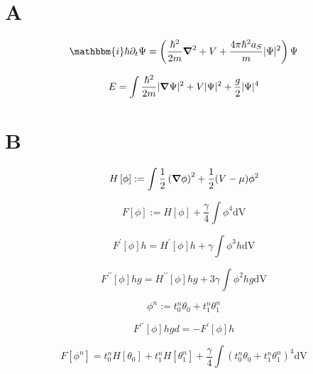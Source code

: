 \documentclass[12pt,a4paper]{article}
\author{Želimir Marojević}
\newcommand{\iu}{\ensuremath{\mathbbm{i}}}
\newcommand{\dV}{\ensuremath{\mathrm{dV}}}
\begin{document}
\section{A}

\begin{equation}
\iu \hbar \partial_t \Psi = \left( \frac{\hbar^2}{2m} \grad^2 + V + \frac{4\pi\hbar^2a_S}{m} \vert \Psi \vert^2 \right) \Psi
\end{equation}

\begin{equation}
E = \int \frac{\hbar^2}{2m} \vert \grad \Psi \vert^2 + V \vert \Psi \vert^2 + \frac{g}{2} \vert \Psi \vert^4
\end{equation}

\section{B}
\begin{equation}
H\left[\phi\right] := \int \frac{1}{2} \left( \grad \phi \right)^2 + \frac{1}{2} (V-\mu)\phi^2
\end{equation}

\begin{equation}
F\left[\phi\right] := H\left[\phi\right] + \frac{\gamma}{4}\int\phi^4 \dV
\end{equation}

\begin{equation}
F^\prime\left[\phi\right] h = H^\prime\left[\phi\right] h + \gamma \int \phi^3 h \dV
\end{equation}

\begin{equation}
F^{\prime\prime}\left[\phi\right] h g = H^{\prime\prime}\left[\phi\right] h g + 3 \gamma \int \phi^2 h g \dV
\end{equation}

\begin{equation}
\phi^n := t^n_0 \theta_0 + t^n_1 \theta^n_1
\end{equation}

\begin{equation}
F^{\prime\prime}\left[\phi\right] h g d = -F^\prime\left[\phi\right] h
\end{equation}


\begin{equation}
F\left[\phi^n\right] = t^n_0 H\left[\theta_0\right] + t^n_1 H\left[\theta^n_1\right] + \frac{\gamma}{4} \int \left(t^n_0 \theta_0 + t^n_1 \theta^n_1\right)^4 \dV
\end{equation}
\end{document}
